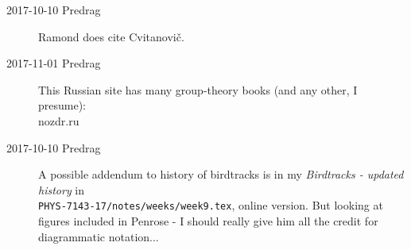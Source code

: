 \begin{description}
\item[2017-10-10  Predrag]
Ramond does cite Cvitanovi\v{c}.

\item[2017-11-01 Predrag]
This Russian site has many group-theory books (and any other, I presume):\\
 {nozdr.ru}


\item[2017-10-10  Predrag]
A possible addendum to history of birdtracks is in my
{\em Birdtracks - updated history} in\\
\texttt{PHYS-7143-17/notes/weeks/week9.tex},
{online version}.
But looking at figures included in Penrose - I should
really give him all the credit for diagrammatic notation...



\end{description}


\printbibliography[heading=subbibintoc,title={References}]
